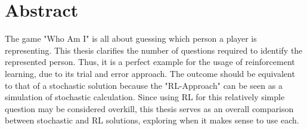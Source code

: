 \chapter{Abstract}

The game "Who Am I" is all about guessing which person a player is representing. This thesis clarifies the number of questions required to identify the represented person. Thus, it is a perfect example for the usage of reinforcement learning, due to its trial and error approach. The outcome should be equivalent to that of a stochastic solution because the "RL-Approach" can be seen as a simulation of stochastic calculation. Since using RL for this relatively simple question may be considered overkill, this thesis serves as an overall comparison between stochastic and RL solutions, exploring when it makes sense to use each.